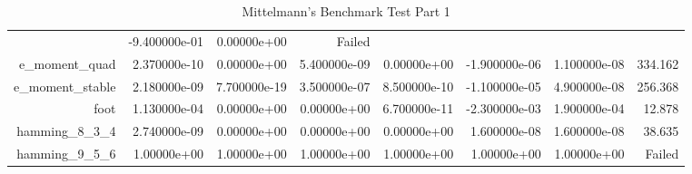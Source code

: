 {{\begin{table}[h]
\begin{center}
{\begin{tabular}{r|r|r|r|r|r|r|r}
      & -9.400000e-01 & 0.00000e+00 & Failed\\
      e\_moment\_quad & 2.370000e-10 & 0.00000e+00 & 5.400000e-09 &
      0.00000e+00 & -1.900000e-06 & 1.100000e-08 & 334.162\\
      e\_moment\_stable & 2.180000e-09 & 7.700000e-19 & 3.500000e-07 &
      8.500000e-10 & -1.100000e-05 & 4.900000e-08 & 256.368\\
      foot & 1.130000e-04 & 0.00000e+00 & 0.00000e+00 & 6.700000e-11 &
      -2.300000e-03 & 1.900000e-04 & 12.878\\
      hamming\_8\_3\_4 & 2.740000e-09 & 0.00000e+00 & 0.00000e+00 &
      0.00000e+00 & 1.600000e-08 & 1.600000e-08 & 38.635\\
      hamming\_9\_5\_6 & 1.00000e+00 & 1.00000e+00 & 1.00000e+00 & 1.00000e+00
      & 1.00000e+00 & 1.00000e+00 & Failed\\
      

      \hline
    \end{tabular}
  }  
\end{center}
  \caption{Mittelmann's Benchmark Test Part 1}
\end{table}}}

